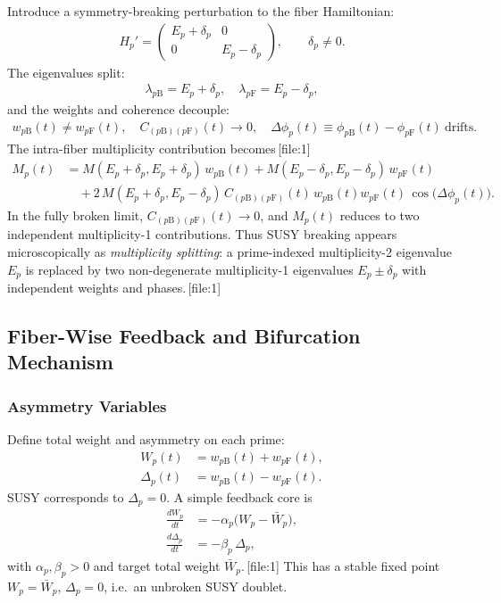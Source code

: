 \documentclass[11pt]{article}
\begin{document}
Introduce a symmetry-breaking perturbation to the fiber Hamiltonian:
\begin{align}
H_p'=
\begin{pmatrix}
E_p+\delta_p & 0\\
0 & E_p-\delta_p
\end{pmatrix},\qquad \delta_p\neq 0.
\end{align}
The eigenvalues split:
\begin{align}
\lambda_{p\mathrm{B}}=E_p+\delta_p,\quad \lambda_{p\mathrm{F}}=E_p-\delta_p,
\end{align}
and the weights and coherence decouple:
\begin{align}
w_{p\mathrm{B}}(t)\neq w_{p\mathrm{F}}(t),\quad
C_{(p\mathrm{B})(p\mathrm{F})}(t)\to 0,\quad
\Delta\phi_p(t)\equiv\phi_{p\mathrm{B}}(t)-\phi_{p\mathrm{F}}(t)\ \text{drifts}.
\end{align}
The intra-fiber multiplicity contribution becomes\,[file:1]
\begin{align}
M_p(t)
&=
M(E_p+\delta_p,E_p+\delta_p)\,w_{p\mathrm{B}}(t)
+
M(E_p-\delta_p,E_p-\delta_p)\,w_{p\mathrm{F}}(t)
\\
&\quad
+2\,M(E_p+\delta_p,E_p-\delta_p)\,
C_{(p\mathrm{B})(p\mathrm{F})}(t)\,
w_{p\mathrm{B}}(t)w_{p\mathrm{F}}(t)\,
\cos\bigl(\Delta\phi_p(t)\bigr).
\end{align}
In the fully broken limit, \(C_{(p\mathrm{B})(p\mathrm{F})}(t)\to 0\), and \(M_p(t)\) reduces to two independent multiplicity-1 contributions. Thus SUSY breaking appears microscopically as \emph{multiplicity splitting}: a prime-indexed multiplicity-2 eigenvalue \(E_p\) is replaced by two non-degenerate multiplicity-1 eigenvalues \(E_p\pm\delta_p\) with independent weights and phases.\,[file:1]

\subsection{Fiber-Wise Feedback and Bifurcation Mechanism}

\subsubsection{Asymmetry Variables}

Define total weight and asymmetry on each prime:
\begin{align}
W_p(t) &= w_{p\mathrm{B}}(t)+w_{p\mathrm{F}}(t),\\
\Delta_p(t) &= w_{p\mathrm{B}}(t)-w_{p\mathrm{F}}(t).
\end{align}
SUSY corresponds to \(\Delta_p=0\). A simple feedback core is
\begin{align}
\frac{dW_p}{dt} &= -\alpha_p\bigl(W_p-\bar{W}_p\bigr),\\
\frac{d\Delta_p}{dt} &= -\beta_p\,\Delta_p,
\end{align}
with \(\alpha_p,\beta_p>0\) and target total weight \(\bar{W}_p\).\,[file:1] This has a stable fixed point \(W_p=\bar{W}_p\), \(\Delta_p=0\), i.e.\ an unbroken SUSY doublet.
\end{document}
